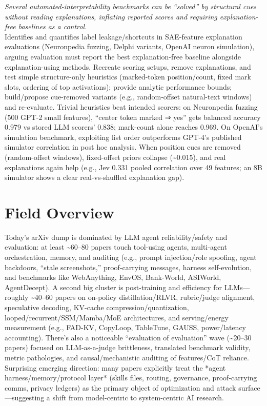 \documentclass[12pt,letterpaper]{article}
\begin{document}
{\small\textit{Several automated-interpretability benchmarks can be ``solved'' by structural cues without reading explanations, inflating reported scores and requiring explanation-free baselines as a control.}}\\[1pt]
{\footnotesize Identifies and quantifies label leakage/shortcuts in SAE-feature explanation evaluations (Neuronpedia fuzzing, Delphi variants, OpenAI neuron simulation), arguing evaluation must report the best explanation-free baseline alongside explanation-using methods. Recreate scoring setups, remove explanations, and test simple structure-only heuristics (marked-token position/count, fixed mark slots, ordering of top activations); provide analytic performance bounds; build/propose cue-removed variants (e.g., random-offset natural-text windows) and re-evaluate. Trivial heuristics beat intended scorers: on Neuronpedia fuzzing (500 GPT-2 small features), ``center token marked ⇒ yes'' gets balanced accuracy 0.979 vs stored LLM scorers' 0.838; mark-count alone reaches 0.969. On OpenAI's simulation benchmark, exploiting list order outperforms GPT-4's published simulator correlation in post hoc analysis. When position cues are removed (random-offset windows), fixed-offset priors collapse (\textasciitilde{}0.015), and real explanations again help (e.g., Jev 0.331 pooled correlation over 49 features; an 8B simulator shows a clear real-vs-shuffled explanation gap).}

\medskip



\section*{Field Overview}
{\footnotesize Today's arXiv dump is dominated by LLM agent reliability/safety and evaluation: at least \textasciitilde{}60--80 papers touch tool-using agents, multi-agent orchestration, memory, and auditing (e.g., prompt injection/role spoofing, agent backdoors, ``stale screenshots,'' proof-carrying messages, harness self-evolution, and benchmarks like WebAnything, EnvOS, Bank-World, ASIWorld, AgentDecept). A second big cluster is post-training and efficiency for LLMs---roughly \textasciitilde{}40--60 papers on on-policy distillation/RLVR, rubric/judge alignment, speculative decoding, KV-cache compression/quantization, looped/recurrent/SSM/Mamba/MoE architectures, and serving/energy measurement (e.g., FAD-KV, CopyLoop, TableTune, GAUSS, power/latency accounting). There's also a noticeable ``evaluation of evaluation'' wave (\textasciitilde{}20--30 papers) focused on LLM-as-a-judge brittleness, translated benchmark validity, metric pathologies, and causal/mechanistic auditing of features/CoT reliance. Surprising emerging direction: many papers explicitly treat the *agent harness/memory/protocol layer* (skills files, routing, governance, proof-carrying comms, privacy ledgers) as the primary object of optimization and attack surface---suggesting a shift from model-centric to system-centric AI research.}
\end{document}
